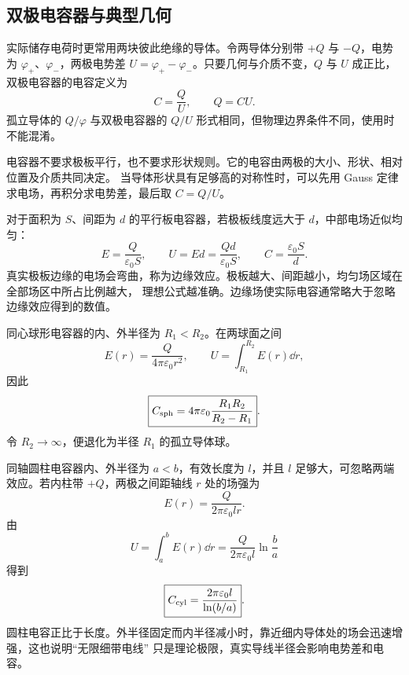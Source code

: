 \subsection*{双极电容器与典型几何}

实际储存电荷时更常用两块彼此绝缘的导体。令两导体分别带 $+Q$ 与 $-Q$，电势为
$\varphi_+$、$\varphi_-$，两极电势差
$U=\varphi_+-\varphi_-$。只要几何与介质不变，$Q$ 与 $U$ 成正比，双极电容器的电容定义为
\begin{equation}
  \boxed{C=\frac{Q}{U}},\qquad Q=CU.
\end{equation}
孤立导体的 $Q/\varphi$ 与双极电容器的 $Q/U$ 形式相同，但物理边界条件不同，使用时不能混淆。

\arbitraryCapacitorDiagram

电容器不要求极板平行，也不要求形状规则。它的电容由两极的大小、形状、相对位置及介质共同决定。
当导体形状具有足够高的对称性时，可以先用 Gauss 定律求电场，再积分求电势差，最后取 $C=Q/U$。

对于面积为 $S$、间距为 $d$ 的平行板电容器，若极板线度远大于 $d$，中部电场近似均匀：
\begin{equation}
  E=\frac{Q}{\varepsilon_0S},\qquad
  U=Ed=\frac{Qd}{\varepsilon_0S},
  \qquad
  \boxed{C=\frac{\varepsilon_0S}{d}}.
\end{equation}
真实极板边缘的电场会弯曲，称为边缘效应。极板越大、间距越小，均匀场区域在全部场区中所占比例越大，
理想公式越准确。边缘场使实际电容通常略大于忽略边缘效应得到的数值。

同心球形电容器的内、外半径为 $R_1<R_2$。在两球面之间
\begin{equation}
  E(r)=\frac{Q}{4\pi\varepsilon_0r^2},
  \qquad
  U=\int_{R_1}^{R_2}E(r)\dd r,
\end{equation}
因此
\begin{equation}
  \boxed{C_{\rm sph}=4\pi\varepsilon_0\frac{R_1R_2}{R_2-R_1}}.
\end{equation}
令 $R_2\to\infty$，便退化为半径 $R_1$ 的孤立导体球。

同轴圆柱电容器内、外半径为 $a<b$，有效长度为 $l$，并且 $l$ 足够大，可忽略两端效应。若内柱带
$+Q$，两极之间距轴线 $r$ 处的场强为
\begin{equation}
  E(r)=\frac{Q}{2\pi\varepsilon_0lr}.
\end{equation}
由
\begin{equation}
  U=\int_a^bE(r)\dd r
   =\frac{Q}{2\pi\varepsilon_0l}\ln\frac ba
\end{equation}
得到
\begin{equation}
  \boxed{C_{\rm cyl}=\frac{2\pi\varepsilon_0l}{\ln(b/a)}}.
\end{equation}
圆柱电容正比于长度。外半径固定而内半径减小时，靠近细内导体处的场会迅速增强，这也说明“无限细带电线”
只是理论极限，真实导线半径会影响电势差和电容。

